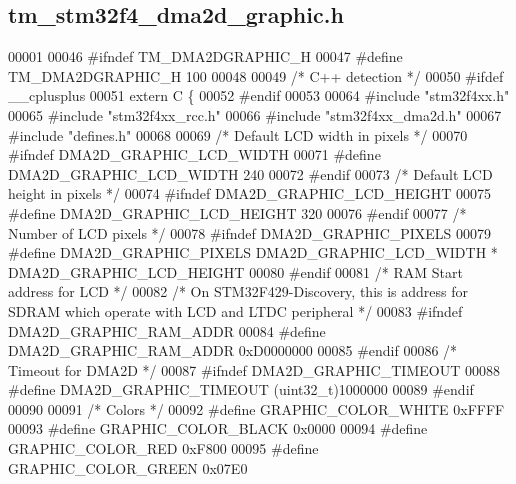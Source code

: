 \hypertarget{tm__stm32f4__dma2d__graphic_8h_source}{}\subsection{tm\+\_\+stm32f4\+\_\+dma2d\+\_\+graphic.\+h}

\begin{DoxyCode}
00001 
00046 \textcolor{preprocessor}{#ifndef TM\_DMA2DGRAPHIC\_H}
00047 \textcolor{preprocessor}{#define TM\_DMA2DGRAPHIC\_H 100}
00048 
00049 \textcolor{comment}{/* C++ detection */}
00050 \textcolor{preprocessor}{#ifdef \_\_cplusplus}
00051 \textcolor{keyword}{extern} C \{
00052 \textcolor{preprocessor}{#endif}
00053 
00064 \textcolor{preprocessor}{#include "stm32f4xx.h"}
00065 \textcolor{preprocessor}{#include "stm32f4xx\_rcc.h"}
00066 \textcolor{preprocessor}{#include "stm32f4xx\_dma2d.h"}
00067 \textcolor{preprocessor}{#include "defines.h"}
00068 
00069 \textcolor{comment}{/* Default LCD width in pixels */}
00070 \textcolor{preprocessor}{#ifndef DMA2D\_GRAPHIC\_LCD\_WIDTH}
00071 \textcolor{preprocessor}{#define DMA2D\_GRAPHIC\_LCD\_WIDTH     240}
00072 \textcolor{preprocessor}{#endif}
00073 \textcolor{comment}{/* Default LCD height in pixels */}
00074 \textcolor{preprocessor}{#ifndef DMA2D\_GRAPHIC\_LCD\_HEIGHT}
00075 \textcolor{preprocessor}{#define DMA2D\_GRAPHIC\_LCD\_HEIGHT    320}
00076 \textcolor{preprocessor}{#endif}
00077 \textcolor{comment}{/* Number of LCD pixels */}
00078 \textcolor{preprocessor}{#ifndef DMA2D\_GRAPHIC\_PIXELS}
00079 \textcolor{preprocessor}{#define DMA2D\_GRAPHIC\_PIXELS        DMA2D\_GRAPHIC\_LCD\_WIDTH * DMA2D\_GRAPHIC\_LCD\_HEIGHT}
00080 \textcolor{preprocessor}{#endif}
00081 \textcolor{comment}{/* RAM Start address for LCD */}
00082 \textcolor{comment}{/* On STM32F429-Discovery, this is address for SDRAM which operate with LCD and LTDC peripheral */}
00083 \textcolor{preprocessor}{#ifndef DMA2D\_GRAPHIC\_RAM\_ADDR}
00084 \textcolor{preprocessor}{#define DMA2D\_GRAPHIC\_RAM\_ADDR      0xD0000000}
00085 \textcolor{preprocessor}{#endif}
00086 \textcolor{comment}{/* Timeout for DMA2D */}
00087 \textcolor{preprocessor}{#ifndef DMA2D\_GRAPHIC\_TIMEOUT}
00088 \textcolor{preprocessor}{#define DMA2D\_GRAPHIC\_TIMEOUT       (uint32\_t)1000000}
00089 \textcolor{preprocessor}{#endif}
00090 
00091 \textcolor{comment}{/* Colors */}
00092 \textcolor{preprocessor}{#define GRAPHIC\_COLOR\_WHITE         0xFFFF}
00093 \textcolor{preprocessor}{#define GRAPHIC\_COLOR\_BLACK         0x0000}
00094 \textcolor{preprocessor}{#define GRAPHIC\_COLOR\_RED           0xF800}
00095 \textcolor{preprocessor}{#define GRAPHIC\_COLOR\_GREEN         0x07E0}

\end{DoxyCode}
